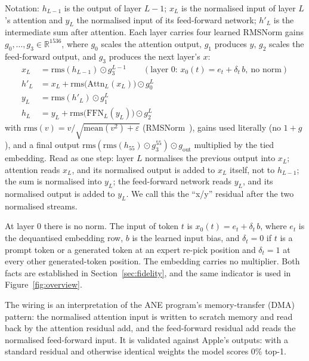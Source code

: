 \documentclass[11pt,reqno]{amsart}
\theoremstyle{definition}
\begin{document}
Notation: $h_{L-1}$ is the output of layer $L-1$; $x_L$ is the normalised input of layer $L$'s attention and $y_L$ the normalised input of its feed-forward network; $h'_L$ is the intermediate sum after attention. Each layer carries four learned RMSNorm gains $g_0,\dots,g_3\in\mathbb{R}^{1536}$, where $g_0$ scales the attention output, $g_1$ produces $y$, $g_2$ scales the feed-forward output, and $g_3$ produces the next layer's $x$:
\begin{align*}
x_L &= \mathrm{rms}(h_{L-1})\odot g_3^{L-1}\qquad(\text{layer 0: } x_0(t) = e_t + \delta_t\,b,\ \text{no norm})\\
h'_L &= x_L + \mathrm{rms}\big(\mathrm{Attn}_L(x_L)\big)\odot g_0^{L}\\
y_L &= \mathrm{rms}(h'_L)\odot g_1^{L}\\
h_L &= y_L + \mathrm{rms}\big(\mathrm{FFN}_L(y_L)\big)\odot g_2^{L}
\end{align*}
with $\mathrm{rms}(v)=v/\sqrt{\mathrm{mean}(v^2)+\varepsilon}$ (RMSNorm~\cite{zhang2019rmsnorm}), gains used literally (no $1+g$), and a final output $\mathrm{rms}(\mathrm{rms}(h_{55})\odot g_3^{55})\odot g_\mathrm{out}$ multiplied by the tied embedding. Read as one step: layer $L$ normalises the previous output into $x_L$; attention reads $x_L$, and its normalised output is added to $x_L$ itself, not to $h_{L-1}$; the sum is normalised into $y_L$; the feed-forward network reads $y_L$, and its normalised output is added to $y_L$. We call this the ``x/y'' residual after the two normalised streams.

At layer 0 there is no norm. The input of token $t$ is $x_0(t)=e_t+\delta_t\,b$, where $e_t$ is the dequantised embedding row, $b$ is the learned input bias, and $\delta_t=0$ if $t$ is a prompt token or a generated token at an expert re-pick position and $\delta_t=1$ at every other generated-token position. The embedding carries no multiplier. Both facts are established in Section~\ref{sec:fidelity}, and the same indicator is used in Figure~\ref{fig:overview}.

The wiring is an interpretation of the ANE program's memory-transfer (DMA) pattern: the normalised attention input is written to scratch memory and read back by the attention residual add, and the feed-forward residual add reads the normalised feed-forward input. It is validated against Apple's outputs: with a standard residual and otherwise identical weights the model scores 0\% top-1.
\end{document}

